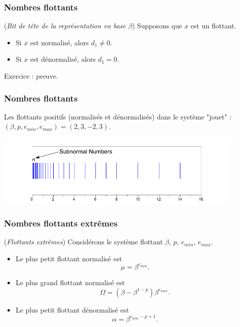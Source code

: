 \documentclass{beamer}
\begin{document}

\begin{frame}
\frametitle{Nombres flottants}
\begin{theorem}
(\emph{Bit de tête de la représentation en base $\beta$})
Supposons que $x$ est un flottant. 
\begin{itemize}
\item Si $x$ est normalisé, alors $d_1\neq 0$.
\item Si $x$ est dénormalisé, alors $d_1=0$.
\end{itemize}
\end{theorem}

Exercice : preuve.

\end{frame}


\begin{frame}
\frametitle{Nombres flottants}

Les flottants positifs (normalisés et dénormalisés) dans le système "jouet" : $(\beta,p,e_{min},e_{max})=(2,3,-2,3)$.

\begin{center}
\includegraphics[width=0.9\textwidth]{toysystem_positive}
\end{center}

\end{frame}

\begin{frame}
\frametitle{Nombres flottants extrêmes}

\begin{theorem}
(\emph{Flottants extrêmes})
Considérons le système flottant $\beta$, $p$, $e_{min}$, $e_{max}$.
\begin{itemize}
\item Le plus petit flottant normalisé est
$$
\mu = \beta^{e_{min}}.
$$

\item Le plus grand flottant normalisé est 
$$
\Omega = (\beta - \beta^{1-p}) \beta^{e_{max}}.
$$

\item Le plus petit flottant dénormalisé est 
$$
\alpha = \beta^{e_{min}-p+1}.
$$
\end{itemize}
\end{theorem}

\end{frame}
\end{document}
